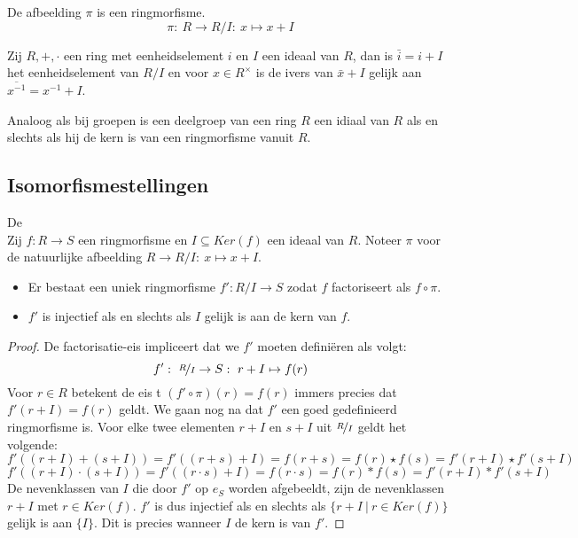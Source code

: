 \documentclass[main.tex]{subfiles}
\begin{document}
\begin{pr}
  De afbeelding $\pi$ is een ringmorfisme.
  \[ \pi:\ R \rightarrow R/I:\ x \mapsto x+I \]
\end{pr}

\begin{st}
  Zij $R,+,\cdot$ een ring met eenheidselement $i$ en $I$ een ideaal van $R$, dan is $\bar{i} = i + I$ het eenheidselement van $R/I$ en voor $x\in R^{\times}$ is de ivers van $\bar{x} + I$ gelijk aan $\overline{x^{-1}} = x^{-1} + I$. 
\end{st}

\begin{opm}
  Analoog als bij groepen is een deelgroep van een ring $R$ een idiaal van $R$ als en slechts als hij de kern is van een ringmorfisme vanuit $R$.
\end{opm}

\subsection{Isomorfismestellingen}
\label{sec:isomorfismestellingen}

\begin{st}
  De \\
  Zij $f: R \rightarrow S$ een ringmorfisme en $I \subseteq Ker(f)$ een ideaal van $R$.
  Noteer $\pi$ voor de natuurlijke afbeelding $R \rightarrow R/I:\ x \mapsto x+I$.
  \begin{itemize}
  \item Er bestaat een uniek ringmorfisme $f': R/I \rightarrow S$ zodat $f$ factoriseert als $f \circ \pi$.
  \item $f'$ is injectief als en slechts als $I$ gelijk is aan de kern van $f$.
  \end{itemize}

  \begin{proof}
    De factorisatie-eis impliceert dat we $f'$ moeten defini\"eren als volgt:
    \[ f':\ \nicefrac{R}{I} \rightarrow S:\ r+I \mapsto f(r) \]
    Voor $r\in R$ betekent de eis t $(f' \circ \pi) (r) = f(r)$ immers precies dat $f'(r+I) = f(r)$ geldt.
    We gaan nog na dat $f'$ een goed gedefinieerd ringmorfisme is.
    Voor elke twee elementen $r+I$ en $s+I$ uit $\nicefrac{R}{I}$ geldt het volgende:
    \[ f'((r+I)+(s+I)) = f'((r+s)+I) = f(r+s) = f(r) \star f(s) = f'(r+I) \star f'(s+I) \]
    \[ f'((r+I) \cdot (s+I)) = f'((r\cdot s) + I) = f(r\cdot s) = f(r) * f(s) = f'(r+I) * f'(s+I) \]
    De nevenklassen van $I$ die door $f'$ op $e_{S}$ worden afgebeeldt, zijn de nevenklassen $r+I$ met $r\in Ker(f)$.
    $f'$ is dus injectief als en slechts als $\{ r+I\ |\ r\in Ker(f)\}$ gelijk is aan $\{I\}$.
    Dit is precies wanneer $I$ de kern is van $f'$.
  \end{proof}
\end{st}
\end{document}

